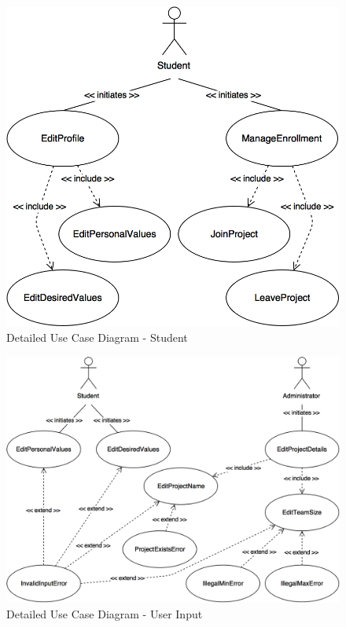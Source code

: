 \documentclass[12pt,letterpaper]{article}
\begin{document}
\begin{figure}[H]
	\centering{}
	\includegraphics[scale=0.3]{imgs/detailed-student-use-case-diagram.png}
	\caption{Detailed Use Case Diagram - Student}
\end{figure}

\begin{figure}[H]
	\centering{}
	\includegraphics[scale=0.3]{imgs/detailed-user-input-use-case-diagram.png}
	\caption{Detailed Use Case Diagram - User Input}
\end{figure}
\end{document}
